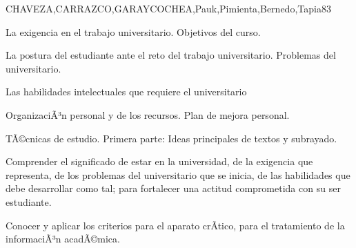\begin{syllabus}
\begin{outcomes}
\end{outcomes}

\begin{unit}{}{CHAVEZA,CARRAZCO,GARAYCOCHEA,Pauk,Pimienta,Bernedo,Tapia}{8}{3}
\begin{topics}
        \item La exigencia en el trabajo universitario. Objetivos del curso.
        \item La postura del estudiante ante el reto del trabajo universitario. Problemas  del universitario.     
        \item Las  habilidades intelectuales que requiere el universitario
        \item OrganizaciÃ³n personal y de los recursos. Plan de mejora personal.
        \item TÃ©cnicas de estudio. Primera parte: Ideas principales de textos y subrayado.       
\end{topics}
\begin{unitgoals}
        \item Comprender el  significado de estar en  la universidad, de la exigencia que representa, de los problemas del universitario que se inicia, de las habilidades que debe desarrollar como tal; para fortalecer una actitud comprometida con su ser estudiante.
        \item Conocer y aplicar los criterios para el aparato crÃ­tico, para el tratamiento de la informaciÃ³n acadÃ©mica.
\end{unitgoals}
\end{unit}


\end{syllabus}
